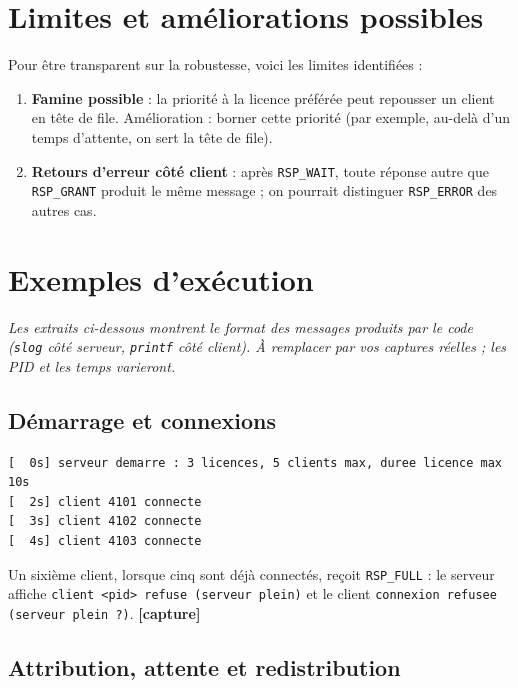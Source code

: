 \documentclass[11pt,a4paper]{article}
\newcommand{\code}[1]{\texttt{#1}}
\begin{document}
\section{Limites et améliorations possibles}
\label{sec:limites}

Pour être transparent sur la robustesse, voici les limites identifiées :
\begin{enumerate}
\item \textbf{Famine possible} : la priorité à la licence préférée peut repousser un client en tête de file. Amélioration : borner cette priorité (par exemple, au-delà d'un temps d'attente, on sert la tête de file).
 \item \textbf{Retours d'erreur côté client} : après \code{RSP\_WAIT}, toute réponse autre que \code{RSP\_GRANT} produit le même message ; on pourrait distinguer \code{RSP\_ERROR} des autres cas.
\end{enumerate}

\section{Exemples d'exécution}

\emph{Les extraits ci-dessous montrent le format des messages produits par le code (\code{slog} côté serveur, \code{printf} côté client). À remplacer par vos captures réelles ; les PID et les temps varieront.}

\subsection{Démarrage et connexions}

\begin{lstlisting}
[  0s] serveur demarre : 3 licences, 5 clients max, duree licence max 10s
[  2s] client 4101 connecte
[  3s] client 4102 connecte
[  4s] client 4103 connecte
\end{lstlisting}

Un sixième client, lorsque cinq sont déjà connectés, reçoit \code{RSP\_FULL} : le serveur affiche \code{client <pid> refuse (serveur plein)} et le client \code{connexion refusee (serveur plein ?)}. \textbf{[capture]}

\subsection{Attribution, attente et redistribution}
\end{document}
